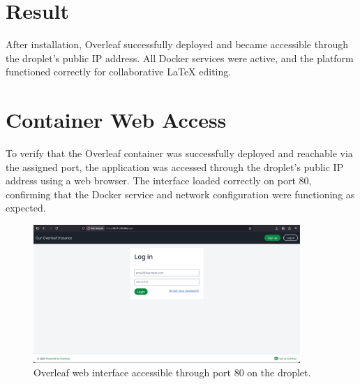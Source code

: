 \section{Result}
After installation, Overleaf successfully deployed and became accessible through the droplet’s public IP address. All Docker services were active, and the platform functioned correctly for collaborative LaTeX editing.

\section{Container Web Access}
To verify that the Overleaf container was successfully deployed and reachable via the assigned port, the application was accessed through the droplet’s public IP address using a web browser. The interface loaded correctly on port 80, confirming that the Docker service and network configuration were functioning as expected.

\begin{figure}[H]
    \centering
    \includegraphics[width=0.9\textwidth]{png/overleaf.png}
    \caption{Overleaf web interface accessible through port 80 on the droplet.}
    \label{fig:overleaf-port}
\end{figure}

